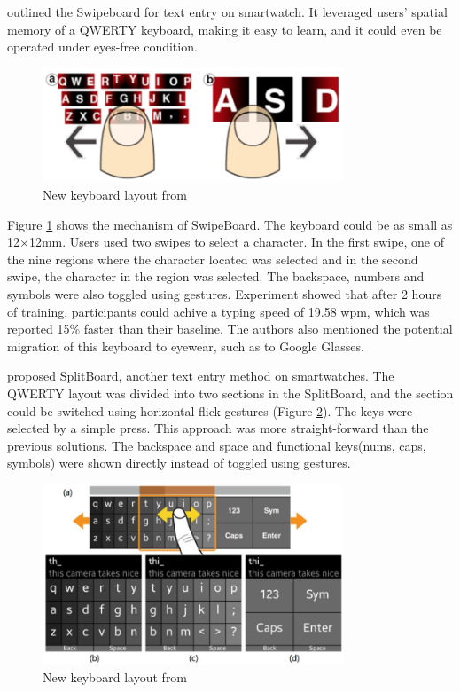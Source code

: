 \documentclass[11pt]{article}
\begin{document}
\citet{10.1145/2642918.2647354} outlined the Swipeboard for text entry on smartwatch. It leveraged users' spatial memory of a QWERTY keyboard, making it easy to learn, and it could even be operated under eyes-free condition.

\begin{figure}[H]
  \centering
  \includegraphics[width=0.8\textwidth]{SwipeBoard.png}
  \caption{New keyboard layout from \citep{10.1145/2642918.2647354}}
  \label{fig:swipeboard}
\end{figure}

Figure \ref{fig:swipeboard} shows the mechanism of SwipeBoard. The keyboard could be as small as 12$\times$12mm. Users used two swipes to select a character. In the first swipe, one of the nine regions where the character located was selected and in the second swipe, the character in the region was selected. The backspace, numbers and symbols were also toggled using gestures. Experiment showed that after 2 hours of training, participants could achive a typing speed of 19.58 wpm, which was reported 15\% faster than their baseline. The authors also mentioned the potential migration of this keyboard to eyewear, such as to Google Glasses.

\citet{10.1145/2702123.2702273} proposed SplitBoard, another text entry method on smartwatches. The QWERTY layout was divided into two sections in the SplitBoard, and the section could be switched using horizontal flick gestures (Figure \ref{fig:splitboard}). The keys were selected by a simple press. This approach was more straight-forward than the previous solutions. The backspace and space and functional keys(nums, caps, symbols) were shown directly instead of toggled using gestures.

\begin{figure}[H]
  \centering
  \includegraphics[width=0.8\textwidth]{SplitBoard.png}
  \caption{New keyboard layout from \citep{10.1145/2702123.2702273}}
  \label{fig:splitboard}
\end{figure}
\end{document}
